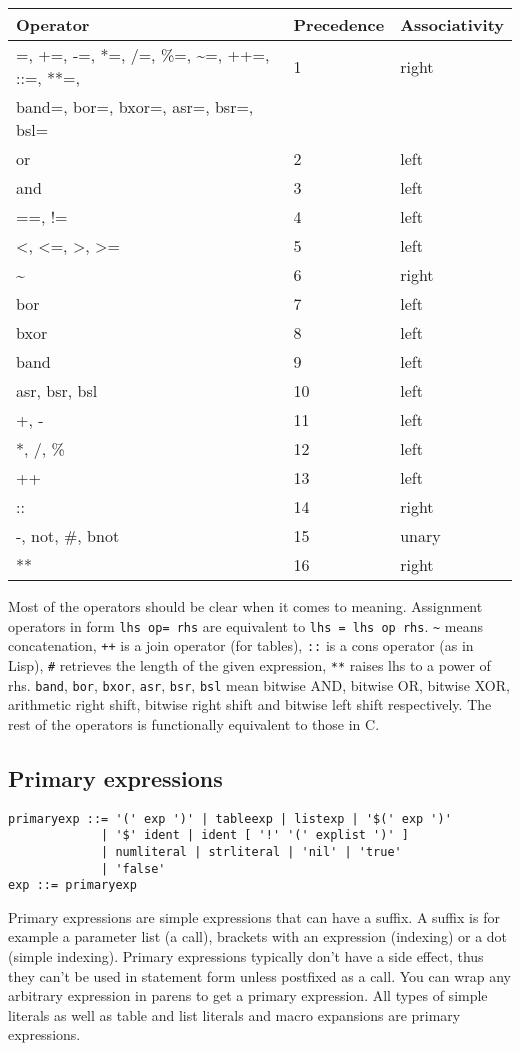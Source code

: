 \documentclass{article}
\begin{document}
\begin{center}
\begin{tabular}{| l | l | l |}
\hline
\textbf{Operator} & \textbf{Precedence} & \textbf{Associativity} \\ \hline
=, +=, -=, *=, /=, \%=, \~{}=, ++=, ::=, **=, & 1 & right \\
band=, bor=, bxor=, asr=, bsr=, bsl= & & \\ \hline
or & 2 & left \\ \hline
and & 3 & left \\ \hline
==, != & 4 & left \\ \hline
\textless, \textless=, \textgreater, \textgreater= & 5 & left \\ \hline
\~{} & 6 & right \\ \hline
bor & 7 & left \\ \hline
bxor & 8 & left \\ \hline
band & 9 & left \\ \hline
asr, bsr, bsl & 10 & left \\ \hline
+, - & 11 & left \\ \hline
*, /, \% & 12 & left \\ \hline
++ & 13 & left \\ \hline
:: & 14 & right \\ \hline
-, not, \#, bnot & 15 & unary \\ \hline
** & 16 & right \\ \hline
\end{tabular}
\end{center}
Most of the operators should be clear when it comes to meaning. Assignment
operators in form \verb|lhs op= rhs| are equivalent to \verb|lhs = lhs op rhs|.
\verb|~| means concatenation, \verb|++| is a join operator (for tables),
\verb|::| is a cons operator (as in Lisp), \verb|#| retrieves the length
of the given expression, \verb|**| raises lhs to a power of rhs. \verb|band|,
\verb|bor|, \verb|bxor|, \verb|asr|, \verb|bsr|, \verb|bsl| mean bitwise AND,
bitwise OR, bitwise XOR, arithmetic right shift, bitwise right shift and
bitwise left shift respectively. The rest of the operators is functionally
equivalent to those in C.
\subsection{Primary expressions}
\begin{lstlisting}[language=bnf]
primaryexp ::= '(' exp ')' | tableexp | listexp | '$(' exp ')'
             | '$' ident | ident [ '!' '(' explist ')' ]
             | numliteral | strliteral | 'nil' | 'true'
             | 'false'
exp ::= primaryexp
\end{lstlisting}
Primary expressions are simple expressions that can have a suffix. A suffix
is for example a parameter list (a call), brackets with an expression
(indexing) or a dot (simple indexing). Primary expressions typically don't
have a side effect, thus they can't be used in statement form unless postfixed
as a call. You can wrap any arbitrary expression in parens to get a primary
expression. All types of simple literals as well as table and list literals
and macro expansions are primary expressions.
\end{document}
